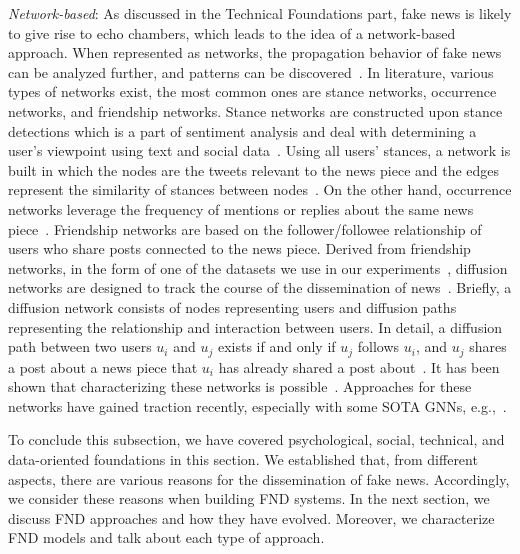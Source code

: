 \begin{description}
    \item{\emph{Network-based}:} As discussed in the Technical Foundations part, fake news is likely to give rise to echo chambers, which leads to the idea of a network-based approach. When represented as networks, the propagation behavior of fake news can be analyzed further, and patterns can be discovered~\parencite{FakeNewsDetectionOnSocialMediaADataMiningPerspective_Shu}. In literature, various types of networks exist, the most common ones are stance networks, occurrence networks, and friendship networks. Stance networks are constructed upon stance detections which is a part of sentiment analysis and deal with determining a user’s viewpoint using text and social data~\parencite{StanceClassificationAttention_Du}. Using all users’ stances, a network is built in which the nodes are the tweets relevant to the news piece and the edges represent the similarity of stances between nodes~\parencite{NewsVerificationByExploitingConflictingSocialViewpoints_Jin, SomeLikeItHoaxDataset_Tacchini}. On the other hand, occurrence networks leverage the frequency of mentions or replies about the same news piece~\parencite{ProminentFeaturesOfRumorPropagation_Kwon}. Friendship networks are based on the follower/followee relationship of users who share posts connected to the news piece. Derived from friendship networks, in the form of one of the datasets we use in our experiments~\parencite{UPFD_Dataset_Shu}, diffusion networks are designed to track the course of the dissemination of news~\parencite{ProminentFeaturesOfRumorPropagation_Kwon}. Briefly, a diffusion network consists of nodes representing users and diffusion paths representing the relationship and interaction between users. In detail, a diffusion path between two users $u_i$ and $u_j$ exists if and only if $u_j$ follows $u_i$, and $u_j$ shares a post about a news piece that $u_i$ has already shared a post about~\parencite{FakeNewsDetectionOnSocialMediaADataMiningPerspective_Shu}. It has been shown that characterizing these networks is possible~\parencite{ProminentFeaturesOfRumorPropagation_Kwon}. Approaches for these networks have gained traction recently, especially with some SOTA GNNs, e.g.,~\parencite{FakeNewsDetectionUsingGeometricDeepLearning_Monti}.

\end{description}

To conclude this subsection, we have covered psychological, social, technical, and data-oriented foundations in this section. We established that,  from different aspects, there are various reasons for the dissemination of fake news. Accordingly, we consider these reasons when building FND systems. In the next section, we discuss FND approaches and how they have evolved. Moreover, we characterize FND models and talk about each type of approach.


